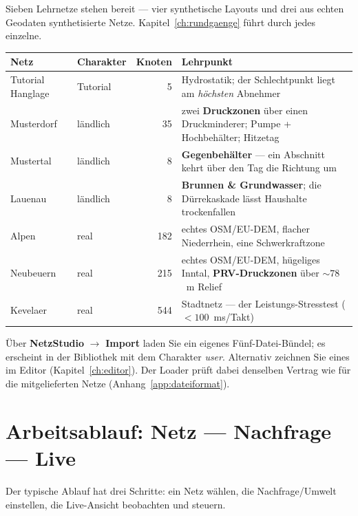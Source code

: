 \documentclass[11pt,a4paper,parskip=half]{scrreprt}
\newcommand{\ui}[1]{\textsf{\bfseries #1}}      %
\begin{document}
Sieben Lehrnetze stehen bereit — vier synthetische Layouts und drei aus echten
Geodaten synthetisierte Netze. Kapitel~\ref{ch:rundgaenge} führt durch jedes
einzelne.

\begin{center}
\small
\begin{tabularx}{\linewidth}{@{}llrX@{}}
\toprule
Netz & Charakter & Knoten & Lehrpunkt \\
\midrule
Tutorial Hanglage & Tutorial & 5   & Hydrostatik; der Schlechtpunkt liegt am \emph{höchsten} Abnehmer \\
Musterdorf        & ländlich & 35  & zwei \textbf{Druckzonen} über einen Druckminderer; Pumpe + Hochbehälter; Hitzetag \\
Mustertal         & ländlich & 8   & \textbf{Gegenbehälter} — ein Abschnitt kehrt über den Tag die Richtung um \\
Lauenau           & ländlich & 8   & \textbf{Brunnen \& Grundwasser}; die Dürrekaskade lässt Haushalte trockenfallen \\
Alpen             & real     & 182 & echtes OSM/EU-DEM, flacher Niederrhein, eine Schwerkraftzone \\
Neubeuern         & real     & 215 & echtes OSM/EU-DEM, hügeliges Inntal, \textbf{PRV-Druckzonen} über $\sim78$~m Relief \\
Kevelaer          & real     & 544 & Stadtnetz — der Leistungs-Stresstest ($<100$~ms/Takt) \\
\bottomrule
\end{tabularx}
\end{center}

\begin{beispiel}
Über \ui{NetzStudio} $\to$ \ui{Import} laden Sie ein eigenes Fünf-Datei-Bündel;
es erscheint in der Bibliothek mit dem Charakter \emph{user}. Alternativ zeichnen
Sie eines im Editor (Kapitel~\ref{ch:editor}). Der Loader prüft dabei denselben
Vertrag wie für die mitgelieferten Netze (Anhang~\ref{app:dateiformat}).
\end{beispiel}

\chapter{Arbeitsablauf: Netz — Nachfrage — Live}
\label{ch:arbeitsablauf}

Der typische Ablauf hat drei Schritte: ein Netz wählen, die Nachfrage/Umwelt
einstellen, die Live-Ansicht beobachten und steuern.
\end{document}

